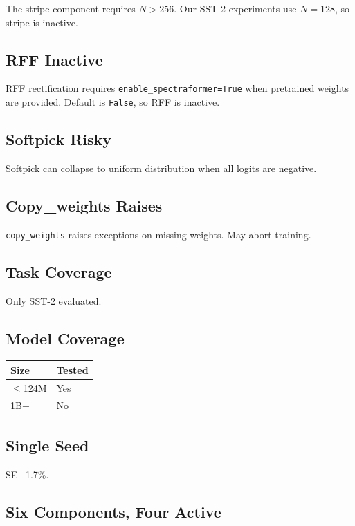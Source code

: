 The stripe component requires $N > 256$. Our SST-2 experiments use 
$N = 128$, so stripe is inactive.

\subsection{RFF Inactive}

RFF rectification requires \texttt{enable\_spectraformer=True} when pretrained 
weights are provided. Default is \texttt{False}, so RFF is inactive.

\subsection{Softpick Risky}

Softpick can collapse to uniform distribution when all logits are negative.

\subsection{Copy\_weights Raises}

\texttt{copy\_weights} raises exceptions on missing weights. May abort training.

\subsection{Task Coverage}

Only SST-2 evaluated.

\subsection{Model Coverage}

\begin{table}[H]
\centering
\small
\begin{tabular}{ll}
\toprule
\textbf{Size} & \textbf{Tested} \\
\midrule
$\le$124M & Yes \\
1B+ & No \\
\bottomrule
\end{tabular}
\end{table}

\subsection{Single Seed}

SE ~1.7\%.

\subsection{Six Components, Four Active}

